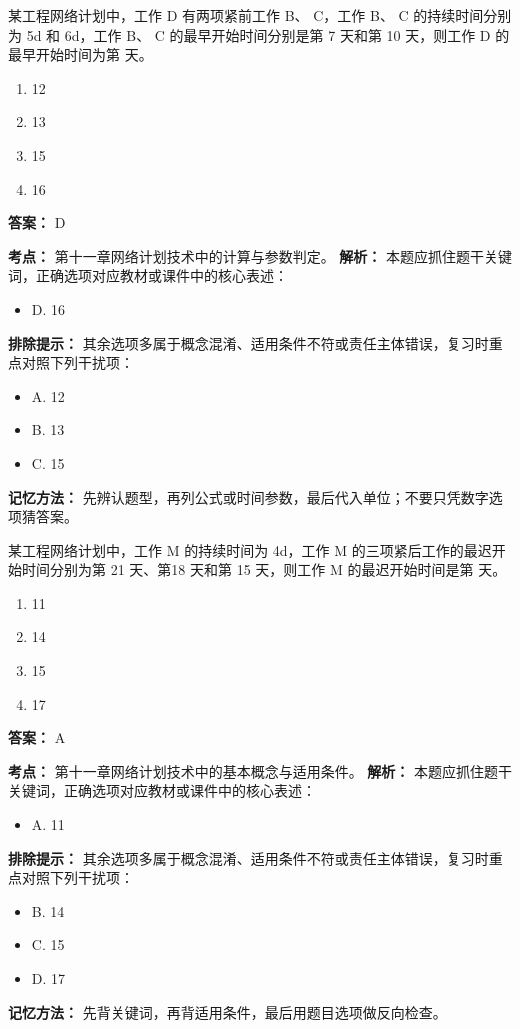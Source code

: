 \documentclass[UTF8,fontset=fandol,11pt]{ctexart}
\begin{document}
\begin{quizbox}[title={第 6 题}]
某工程网络计划中，工作 D 有两项紧前工作 B、 C，工作 B、 C 的持续时间分别为 5d 和 6d，工作 B、 C 的最早开始时间分别是第 7 天和第 10 天，则工作 D 的最早开始时间为第 天。\\
\begin{enumerate}[label=\Alph*.]
\item 12
\item 13
\item 15
\item 16
\end{enumerate}
\textbf{答案：} D
\vspace{0.25em}
\begin{answerbox}[title={考点解析}]
\textbf{考点：} 第十一章网络计划技术中的计算与参数判定。
\textbf{解析：} 本题应抓住题干关键词，正确选项对应教材或课件中的核心表述：
\begin{itemize}
\item D. 16
\end{itemize}
\textbf{排除提示：} 其余选项多属于概念混淆、适用条件不符或责任主体错误，复习时重点对照下列干扰项：
\begin{itemize}
\item A. 12
\item B. 13
\item C. 15
\end{itemize}
\textbf{记忆方法：} 先辨认题型，再列公式或时间参数，最后代入单位；不要只凭数字选项猜答案。
\end{answerbox}
\end{quizbox}

\vspace{0.2em}

\begin{quizbox}[title={第 7 题}]
某工程网络计划中，工作 M 的持续时间为 4d，工作 M 的三项紧后工作的最迟开始时间分别为第 21 天、第18 天和第 15 天，则工作 M 的最迟开始时间是第 天。\\
\begin{enumerate}[label=\Alph*.]
\item 11
\item 14
\item 15
\item 17
\end{enumerate}
\textbf{答案：} A
\vspace{0.25em}
\begin{answerbox}[title={考点解析}]
\textbf{考点：} 第十一章网络计划技术中的基本概念与适用条件。
\textbf{解析：} 本题应抓住题干关键词，正确选项对应教材或课件中的核心表述：
\begin{itemize}
\item A. 11
\end{itemize}
\textbf{排除提示：} 其余选项多属于概念混淆、适用条件不符或责任主体错误，复习时重点对照下列干扰项：
\begin{itemize}
\item B. 14
\item C. 15
\item D. 17
\end{itemize}
\textbf{记忆方法：} 先背关键词，再背适用条件，最后用题目选项做反向检查。
\end{answerbox}
\end{quizbox}
\end{document}
